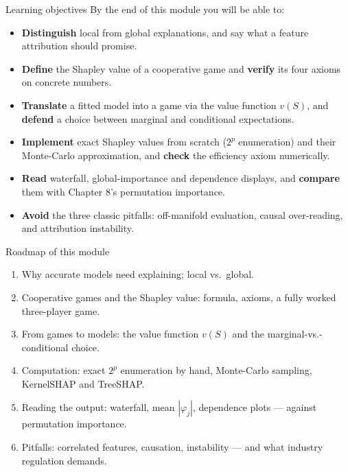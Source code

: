 \documentclass[aspectratio=169,11pt]{beamer}
\begin{document}
\begin{frame}{Learning objectives}
  By the end of this module you will be able to:
  \begin{itemize}
    \item \textbf{Distinguish} local from global explanations, and say what a
          feature attribution should promise.
    \item \textbf{Define} the Shapley value of a cooperative game and
          \textbf{verify} its four axioms on concrete numbers.
    \item \textbf{Translate} a fitted model into a game via the value function
          $v(S)$, and \textbf{defend} a choice between marginal and conditional
          expectations.
    \item \textbf{Implement} exact Shapley values from scratch ($2^p$
          enumeration) and their Monte-Carlo approximation, and \textbf{check}
          the efficiency axiom numerically.
    \item \textbf{Read} waterfall, global-importance and dependence displays,
          and \textbf{compare} them with Chapter 8's permutation importance.
    \item \textbf{Avoid} the three classic pitfalls: off-manifold evaluation,
          causal over-reading, and attribution instability.
  \end{itemize}
\end{frame}

\begin{frame}{Roadmap of this module}
  \begin{takeaway}
    \begin{enumerate}
      \item Why accurate models need explaining; local vs.\ global.
      \item Cooperative games and the Shapley value: formula, axioms, a
            fully worked three-player game.
      \item From games to models: the value function $v(S)$ and the
            marginal-vs.-conditional choice.
      \item Computation: exact $2^p$ enumeration by hand, Monte-Carlo
            sampling, KernelSHAP and TreeSHAP.
      \item Reading the output: waterfall, mean $|\varphi_j|$, dependence
            plots --- against permutation importance.
      \item Pitfalls: correlated features, causation, instability ---
            and what industry regulation demands.
    \end{enumerate}
  \end{takeaway}
\end{frame}
\end{document}

